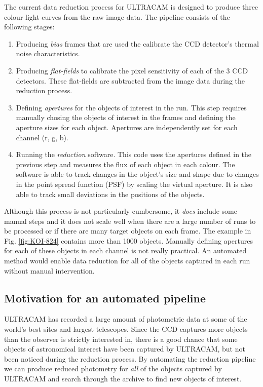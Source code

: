 The current data reduction process for ULTRACAM is designed to produce three colour light curves from the raw image data. The pipeline consists of the following stages:
\begin{enumerate}
	\item Producing \emph{bias} frames that are used the calibrate the CCD detector's thermal noise characteristics. 
	\item Producing \emph{flat-fields} to calibrate the pixel sensitivity of each of the 3 CCD detectors. These flat-fields are subtracted from the image data during the reduction process.
	\item Defining \emph{apertures} for the objects of interest in the run. This step requires manually chosing the objects of interest in the frames and defining the aperture sizes for each object. Apertures are independently set for each channel (r, g, b). 
	\item Running the \emph{reduction} software. This code uses the apertures defined in the previous step and measures the flux of each object in each colour. The software is able to track changes in the object's size and shape due to changes in the point spread function (PSF) by scaling the virtual aperture. It is also able to track small deviations in the positions of the objects. 
\end{enumerate} 
Although this process is not particularly cumbersome, it \emph{does} include some manual steps and it does not scale well when there are a large number of runs to be processed or if there are many target objects on each frame. The example in Fig. \ref{fig:KOI-824} contains more than 1000 objects. Manually defining apertures for each of these objects in each channel is not really practical. An automated method would enable data reduction for all of the objects captured in each run without manual intervention. 

\subsection{Motivation for an automated pipeline}
ULTRACAM has recorded a large amount of photometric data at some of the world's best sites and largest telescopes. Since the CCD captures more objects than the observer is strictly interested in, there is a good chance that some objects of astronomical interest have been captured by ULTRACAM, but not been noticed during the reduction process. By automating the reduction pipeline we can produce reduced photometry for \emph{all} of the objects captured by ULTRACAM and search through the archive to find new objects of interest. 

